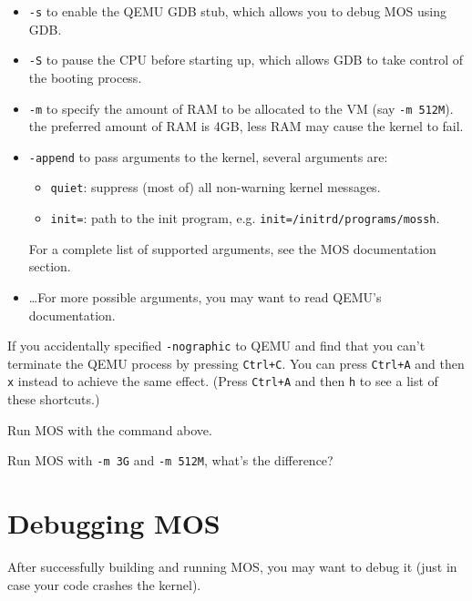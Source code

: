 \begin{itemize}
    \item \texttt{-s} to enable the QEMU GDB stub, which allows you to debug MOS using GDB.
    \item \texttt{-S} to pause the CPU before starting up, which allows GDB to take control of
          the booting process.
    \item \texttt{-m} to specify the amount of RAM to be allocated to the VM (say \texttt{-m 512M}).
          the preferred amount of RAM is 4GB, less RAM may cause the kernel to fail.
    \item \texttt{-append} to pass arguments to the kernel, several arguments are:
          \begin{itemize}
              \item \texttt{quiet}: suppress (most of) all non-warning kernel messages.
              \item \texttt{init=}: path to the init program, e.g. \texttt{init=/initrd/programs/mossh}.
          \end{itemize}
          For a complete list of supported arguments, see the MOS documentation section.
    \item \dots For more possible arguments, you may want to read QEMU's documentation.
\end{itemize}

\begin{tip}
    \item If you accidentally specified \texttt{-nographic} to QEMU and find that you can't terminate
    the QEMU process by pressing \texttt{Ctrl+C}. You can press \texttt{Ctrl+A} and then \texttt{x}
    instead to achieve the same effect. (Press \texttt{Ctrl+A} and then \texttt{h} to see a list of these
    shortcuts.)
\end{tip}

\begin{exercise}
    \item Run MOS with the command above.
    \item Run MOS with \texttt{-m 3G} and \texttt{-m 512M}, what's the difference?
\end{exercise}

\section{Debugging MOS}

After successfully building and running MOS, you may want to debug it (just in case your code crashes
the kernel).

